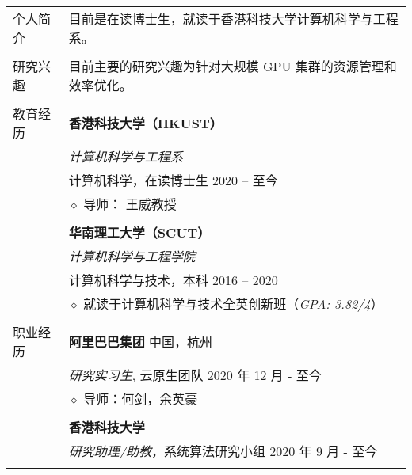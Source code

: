 \documentclass[letterpaper, 11pt]{article}
\begin{document}
\begin{longtable}{p{1.3in}p{4.8in}}

{个人简介}
& 目前是在读博士生，就读于香港科技大学计算机科学与工程系。 \\
& \\

\nohyphens{研究兴趣}
& 目前主要的研究兴趣为针对大规模 GPU 集群的资源管理和效率优化。 \\
& \\

{教育经历}
& \textbf{香港科技大学（HKUST）} \\
& \textit{计算机科学与工程系} \\
& 计算机科学，在读博士生 \hfill 2020 -- 至今 \\
& $\diamond$ 导师： 王威教授 \\
& \\

& \textbf{华南理工大学（SCUT）} \\
& \textit{计算机科学与工程学院} \\
& 计算机科学与技术，本科 \hfill 2016 -- 2020 \\
& $\diamond$ 就读于计算机科学与技术全英创新班（{\it GPA: 3.82/4}） \\
& \\


{职业经历}
& {\textbf{阿里巴巴集团}} \hfill 中国，杭州 \\
& \textit{研究实习生}, 云原生团队 \hfill 2020 年 12 月 - 至今 \\
& $\diamond$ 导师：何剑，余英豪 \\
& \\

& {\textbf{香港科技大学}} \\
& \textit{研究助理/助教}，系统算法研究小组 \hfill 2020 年 9 月 - 至今 \\
& \\
 

\end{longtable}
\end{document}
